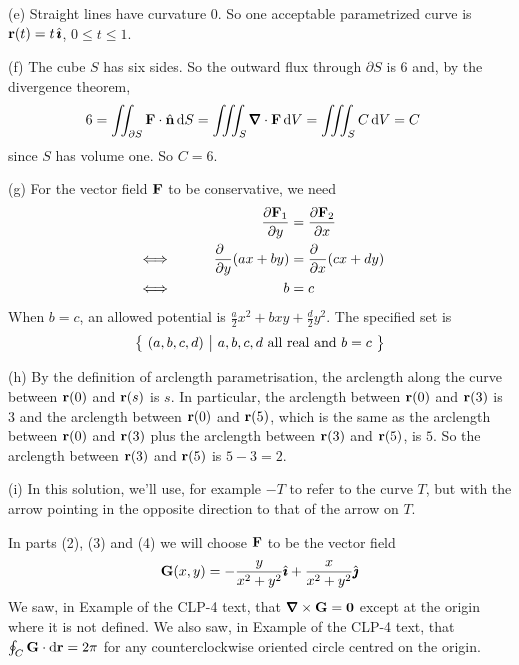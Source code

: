 \begin{solution}
\noindent (e) 
Straight lines have curvature $0$. So one acceptable
parametrized curve is $\mathbf{r}(t) = t\,\hat{\pmb{\imath}}$, $0\le t\le 1$.

\noindent (f) 
The cube $S$ has six sides. So the outward flux through
$\partial S$ is $6$ and, by the divergence theorem,
\begin{align*}
6 &= \dblInt_{\partial S}\vF\cdot\hn\,\dee{S}
   =\tripInt_S \vnabla\cdot\vF\,\dee{V}
   = \tripInt_S C\,\dee{V}
   = C
\end{align*}
since $S$ has volume one. So $C=6$.

\noindent (g)
For the vector field $\mathbf{F}$ to be conservative, we need
\begin{alignat*}{3}
& & 
\frac{\partial\vF_1}{\partial y}  &= \frac{\partial \vF_2}{\partial x} \\
&\iff\qquad & \frac{\partial\hfill}{\partial y}(ax+by) 
     &= \frac{\partial\hfill}{\partial x}(cx+dy) \\
&\iff\qquad & b&=c 
\end{alignat*}
When $b=c$, an allowed potential is $\frac{a}{2}x^2 +bxy + \frac{d}{2}y^2$.
The specified set is
\begin{align*}
\big\{ \ (a,b,c,d)\ \big|\ a,b,c,d\text{ all real and }b=c\ \big\}
\end{align*} 

\noindent (h)
By the definition of arclength parametrisation, the arclength along the
curve between $\mathbf{r}(0)$ and $\mathbf{r}(s)$ is $s$. In particular, the
arclength between $\mathbf{r}(0)$ and $\mathbf{r}(3)$ is $3$ and the
arclength between $\mathbf{r}(0)$ and $\mathbf{r}(5)$, which is the same as the 
arclength between $\mathbf{r}(0)$ and $\mathbf{r}(3)$ plus the 
arclength between $\mathbf{r}(3)$ and $\mathbf{r}(5)$,
is $5$. So the arclength between $\mathbf{r}(3)$ and $\mathbf{r}(5)$ is $5-3=2$.

\noindent (i)
In this solution, we'll use, for example $-T$ to refer to the curve
$T$, but with the arrow pointing in the opposite direction to that of
the arrow on $T$. 

In parts (2), (3) and (4) we will choose $\mathbf{F}$ to be the vector field
\begin{equation*}
\mathbf{G}(x,y) = -\frac{y}{x^2+y^2}\hat{\pmb{\imath}} + \frac{x}{x^2+y^2}\hat{\pmb{\jmath}}
\end{equation*}
We saw, in Example  of 
the CLP-4 text, that $\vnabla\times\vG=\vZero$
except at the origin where it is not defined.
We also saw, in Example  of the CLP-4 text, 
that $\oint_{C}\mathbf{G}\cdot\mathrm{d}\mathbf{r}=2\pi$ for any counterclockwise oriented
circle centred on the origin.



\end{solution}

